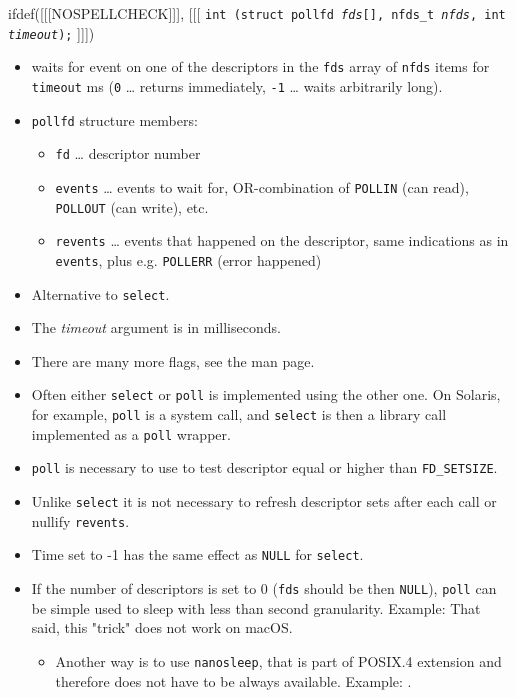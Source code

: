 \begin{slide}
ifdef([[[NOSPELLCHECK]]], [[[
\texttt{int (struct pollfd \emph{fds}[], nfds\_t \emph{nfds},
int \emph{timeout});}
]]])
\begin{itemize}
\item waits for event on one of the descriptors in the \texttt{fds} array
of \texttt{nfds} items for \texttt{timeout} ms (\texttt{0}
\dots{} returns immediately, \texttt{-1} \dots{} waits arbitrarily long).
\item \texttt{pollfd} structure members:
    \begin{itemize}
    \item \texttt{fd} \dots{} descriptor number
    \item \texttt{events} \dots{} events to wait for, OR-combination of
    \texttt{POLLIN} (can read), \texttt{POLLOUT} (can write), etc. 
    \item \texttt{revents} \dots{} events that happened on the descriptor,
    same indications as in \texttt{events}, plus e.g. \texttt{POLLERR}
    (error happened)
    \end{itemize}
\end{itemize}
\end{slide}

\label{POLL}

\begin{itemize}
\item Alternative to \texttt{select}.
\item The \emph{timeout} argument is in milliseconds.
\item There are many more flags, see the man page.
\item Often either \texttt{select} or \texttt{poll} is implemented using the
other one.  On Solaris, for example, \texttt{poll} is a system call, and
\texttt{select} is then a library call implemented as a \texttt{poll} wrapper.
\item \texttt{poll} is necessary to use to test descriptor equal or higher than
\texttt{FD\_SETSIZE}. 
\item Unlike \texttt{select} it is not necessary to refresh descriptor sets
after each call or nullify \texttt{revents}.
\item Time set to -1 has the same effect as \texttt{NULL} for \texttt{select}.
\item If the number of descriptors is set to 0 (\texttt{fds} should be then
\texttt{NULL}), \texttt{poll} can be simple used to sleep with less than second
granularity. Example: \label{POLL_SLEEP_C}  That
said, this "trick" does not work on macOS.
\begin{itemize}
\item Another way is to use \texttt{nanosleep}, that is part of POSIX.4
extension and therefore does not have to be always available.
Example: .
\end{itemize}
\end{itemize}

\endinput
